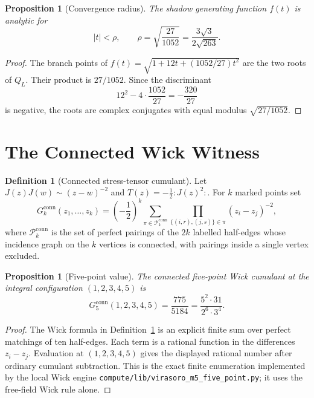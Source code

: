 \documentclass[11pt]{article}
\newtheorem{proposition}[theorem]{Proposition}
\theoremstyle{definition}
\newtheorem{definition}[theorem]{Definition}
\theoremstyle{remark}
\newcommand{\conn}{\mathrm{conn}}
\begin{document}
\begin{proposition}[Convergence radius]
\label{prop:shadow-radius}
The shadow generating function $f(t)$ is analytic for
\[
  |t|<\rho,\qquad
  \rho=\sqrt{\frac{27}{1052}}
       =\frac{3\sqrt{3}}{2\sqrt{263}}.
\]
\end{proposition}

\begin{proof}
The branch points of $f(t)=\sqrt{1+12t+(1052/27)t^2}$ are the two roots
of $Q_L$. Their product is $27/1052$. Since the discriminant
\[
  12^2-4\cdot\frac{1052}{27}=-\frac{320}{27}
\]
is negative, the roots are complex conjugates with equal modulus
$\sqrt{27/1052}$.
\end{proof}

\section{The Connected Wick Witness}
\label{sec:wick-witness}

\begin{definition}[Connected stress-tensor cumulant]
\label{def:connected-cumulant}
Let $J(z)J(w)\sim(z-w)^{-2}$ and
$T(z)=-\frac12{:}J(z)^2{:}$. For $k$ marked points set
\[
  G_k^{\conn}(z_1,\ldots,z_k)
  =
  \left(-\frac12\right)^k
  \sum_{\pi\in\mathcal{P}^{\conn}_{k}}
  \prod_{\{(i,r),(j,s)\}\in\pi}(z_i-z_j)^{-2},
\]
where $\mathcal{P}^{\conn}_{k}$ is the set of perfect pairings of the
$2k$ labelled half-edges whose incidence graph on the $k$ vertices is
connected, with pairings inside a single vertex excluded.
\end{definition}

\begin{proposition}[Five-point value]
\label{prop:g5-value}
The connected five-point Wick cumulant at the integral configuration
$(1,2,3,4,5)$ is
\[
  G_5^{\conn}(1,2,3,4,5)
  =
  \frac{775}{5184}
  =
  \frac{5^2\cdot31}{2^6\cdot3^4}.
\]
\end{proposition}

\begin{proof}
The Wick formula in Definition~\ref{def:connected-cumulant} is an
explicit finite sum over perfect matchings of ten half-edges. Each
term is a rational function in the differences $z_i-z_j$. Evaluation
at $(1,2,3,4,5)$ gives the displayed rational number after ordinary
cumulant subtraction. This is the exact finite enumeration implemented
by the local Wick engine
\texttt{compute/lib/virasoro\_m5\_five\_point.py}; it uses the
free-field Wick rule alone.
\end{proof}
\end{document}
